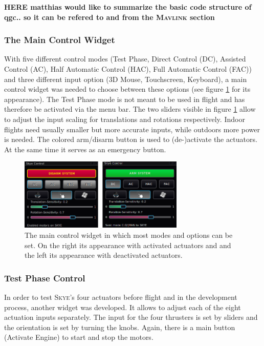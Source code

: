 \textbf{HERE matthias would like to summarize the basic code structure of qgc.. so it can be refered to and from the \textsc{Mavlink} section}



\subsubsection{The Main Control Widget}
With five different control modes (Test Phase, Direct Control (DC), Assisted Control (AC), Half Automatic Control (HAC), Full Automatic Control (FAC)) and three different input option (3D Mouse, Touchscreen, Keyboard), a main control widget was needed to choose between these options (see figure \ref{fig:qgc_skye_control} for its appearance). 
The Test Phase mode is not meant to be used in flight and has therefore be activated via the menu bar.
The two sliders visible in figure \ref{fig:qgc_skye_control} allow to adjust the input scaling for translations and rotations respectively. Indoor flights need usually smaller but more accurate inputs, while outdoors more power is needed. The colored arm/disarm button is used to (de-)activate the actuators. At the same time it serves as an emergency button.

\begin{figure}[H] %
	\begin{center}
		\includegraphics[width=0.7\textwidth]{qgc_skye_control}
		\caption{The main control widget in which most modes and options can be set. On the right its appearance with activated actuators and and the left its appearance with deactivated actuators.}
		\label{fig:qgc_skye_control}		
	\end{center}
\end{figure}



\subsubsection{Test Phase Control}
In order to test \textsc{Skye}'s four actuators before flight and in the development process, another widget was developed. It allows to adjust each of the eight actuation inputs separately. The input for the four thrusters is set by sliders and the orientation is set by turning the knobs. Again, there is a main button (Activate Engine) to start and stop the motors.

